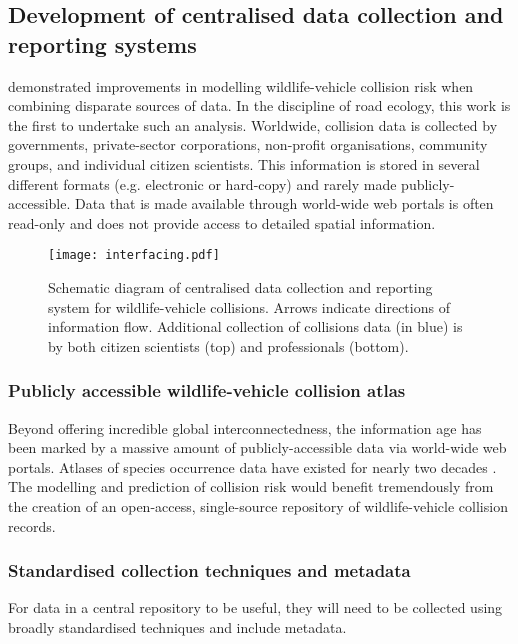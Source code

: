 \subsection{Development of centralised data collection and reporting systems}

 demonstrated improvements in modelling wildlife-vehicle collision risk when combining disparate sources of data. In the discipline of road ecology, this work is the first to undertake such an analysis. Worldwide, collision data is collected by governments, private-sector corporations, non-profit organisations, community groups, and individual citizen scientists. This information is stored in several different formats (e.g. electronic or hard-copy) and rarely made publicly-accessible. Data that is made available through world-wide web portals is often read-only and does not provide access to detailed spatial information.

\begin{figure*}[htp]
  \centering
  \texttt{[image: interfacing.pdf]}
  \caption[Centralised data collection and reporting system]{Schematic diagram of centralised data collection and reporting system for wildlife-vehicle collisions. Arrows indicate directions of information flow. Additional collection of collisions data (in blue) is by both citizen scientists (top) and professionals (bottom).}
  \label{wvc_server}
\end{figure*}

\subsubsection{Publicly accessible wildlife-vehicle collision atlas}

Beyond offering incredible global interconnectedness, the information age has been marked by a massive amount of publicly-accessible data via world-wide web portals. Atlases of species occurrence data have existed for nearly two decades \citep{}. The modelling and prediction of collision risk would benefit tremendously from the creation of an open-access, single-source repository of wildlife-vehicle collision records. 

\subsubsection{Standardised collection techniques and metadata}

For data in a central repository to be useful, they will need to be collected using broadly standardised techniques and include metadata.  

